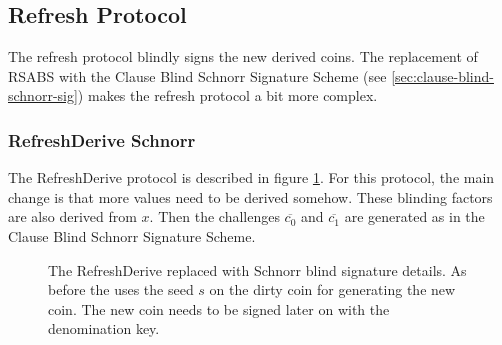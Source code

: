 \subsection{Refresh Protocol}
The refresh protocol blindly signs the new derived coins.
The replacement of \gls{RSABS} with the Clause Blind Schnorr Signature Scheme (see \ref{sec:clause-blind-schnorr-sig}) makes the refresh protocol a bit more complex.

\subsubsection{RefreshDerive Schnorr}
The RefreshDerive protocol is described in figure \ref{fig:refresh-derive-schnorr}.
For this protocol, the main change is that more values need to be derived somehow.
These blinding factors are also derived from $x$.
Then the challenges $\overline{c_0}$ and $\overline{c_1}$ are generated as in the Clause Blind Schnorr Signature Scheme.

\begin{figure}[htp]
  \centering
  \caption[RefreshDerive algorithm]{The RefreshDerive replaced with Schnorr blind signature details. As before the uses the seed $s$ on the dirty coin for generating the new coin.
    The new coin needs to be signed later on with the denomination key.}
  \label{fig:refresh-derive-schnorr}
\end{figure}

